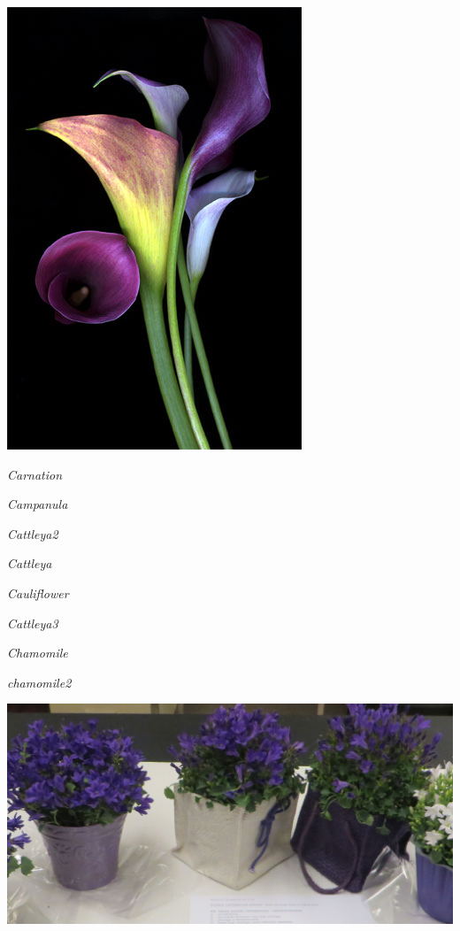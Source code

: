 \documentclass{article}
\begin{document}
\begin{center}
\includegraphics[width=0.9\textheight, angle=90]{../CallaLily_color.jpg}
\end{center}
\newpage

\noindent   
\vfill
\centerline{{\Large\emph{Carnation}}}
\vfill
\newpage

\noindent   
\vfill
\centerline{{\Large\emph{Campanula}}}
\vfill
\newpage

\noindent   
\vfill
\centerline{{\Large\emph{Cattleya2}}}
\vfill
\newpage

\noindent   
\vfill
\centerline{{\Large\emph{Cattleya}}}
\vfill
\newpage

\noindent   
\vfill
\centerline{{\Large\emph{Cauliflower}}}
\vfill
\newpage

\noindent   
\vfill
\centerline{{\Large\emph{Cattleya3}}}
\vfill
\newpage

\noindent   
\vfill
\centerline{{\Large\emph{Chamomile}}}
\vfill
\newpage

\noindent   
\vfill
\centerline{{\Large\emph{chamomile2}}}
\vfill
\newpage

\begin{center}
\includegraphics[width=0.9\textheight, angle=90]{../Campanula.jpg}
\end{center}
\newpage
\end{document}
